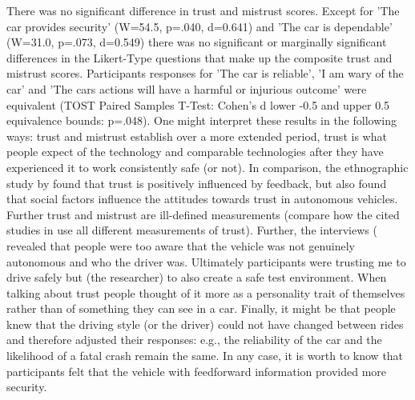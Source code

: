 There was no significant difference in trust and mistrust scores. Except for 'The car provides security' (W=54.5, p=.040, d=0.641) and 'The car is dependable' (W=31.0, p=.073, d=0.549) there was no significant or marginally significant differences in the Likert-Type questions that make up the composite trust and mistrust scores. Participants responses for 'The car is reliable', 'I am wary of the car' and 'The cars actions will have a harmful or injurious outcome' were equivalent (TOST Paired Samples T-Test: Cohen's d lower -0.5 and upper 0.5 equivalence bounds: p=.048).
One might interpret these results in the following ways: trust and mistrust establish over a more extended period, trust is what people expect of the technology and comparable technologies after they have experienced it to work consistently safe (or not). In comparison, the ethnographic study by \cite{Lee2016} found that trust is positively influenced by feedback, but also found that social factors influence the attitudes towards trust in autonomous vehicles. Further trust and mistrust are ill-defined measurements (compare how the cited studies in  use all different measurements of trust). Further, the interviews ( revealed that people were too aware that the vehicle was not genuinely autonomous and who the driver was. Ultimately participants were trusting me to drive safely but (the researcher) to also create a safe test environment. When talking about trust people thought of it more as a personality trait of themselves rather than of something they can see in a car. Finally, it might be that people knew that the driving style (or the driver) could not have changed between rides and therefore adjusted their responses: e.g., the reliability of the car and the likelihood of a fatal crash remain the same. In any case, it is worth to know that participants felt that the vehicle with feedforward information provided more security. %

